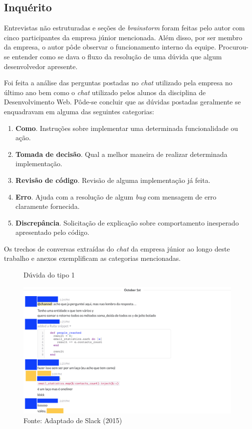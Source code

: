 \subsection{Inquérito}

Entrevistas não estruturadas e seções de \textit{brainstorm} foram feitas pelo autor com cinco participantes da empresa júnior mencionada. Além disso, por ser membro da empresa, o autor pôde observar o funcionamento interno da equipe. Procurou-se entender como se dava o fluxo da resolução de uma dúvida que algum desenvolvedor apresente.

Foi feita a análise das perguntas postadas no \textit{chat} utilizado pela empresa no último ano bem como o \textit{chat} utilizado pelos alunos da disciplina de Desenvolvimento Web. Pôde-se concluir que as dúvidas postadas geralmente se enquadravam em alguma das seguintes categorias:

\begin{enumerate}
  \item \textbf{Como}. Instruções sobre implementar uma determinada funcionalidade ou ação.
  \item \textbf{Tomada de decisão}. Qual a melhor maneira de realizar determinada implementação.
  \item \textbf{Revisão de código}. Revisão de alguma implementação já feita.
  \item \textbf{Erro}. Ajuda com a resolução de algum \textit{bug} com mensagem de erro claramente fornecida.
  \item \textbf{Discrepância}. Solicitação de explicação sobre comportamento inesperado apresentado pelo código.
\end{enumerate}

Os trechos de conversas extraídas do \textit{chat} da empresa júnior ao longo deste trabalho e anexos exemplificam as categorias mencionadas.

\begin{figure}[h]
	\centering
    \caption{Dúvida do tipo 1}
    \includegraphics[width=15cm]{Imagens/c-type-1-9-1.png}
	\caption*{Fonte: Adaptado de Slack (2015)}
\end{figure}

